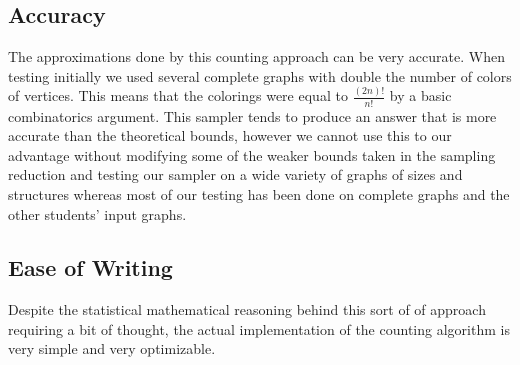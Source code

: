 \documentclass[14]{article}
\begin{document}
\subsection{Accuracy}
The approximations done by this counting approach can be very accurate. When testing initially we used several complete graphs with double the number of colors of vertices. This means that the colorings were equal to $\frac{(2n)!}{n!}$ by a basic combinatorics argument. This sampler tends to produce an answer that is more accurate than the theoretical bounds, however we cannot use this to our advantage without modifying some of the weaker bounds taken in the sampling reduction and testing our sampler on a wide variety of graphs of sizes and structures whereas most of our testing has been done on complete graphs and the other students' input graphs.
\subsection{Ease of Writing}
Despite the statistical mathematical reasoning behind this sort of of approach requiring a bit of thought, the actual implementation of the counting algorithm is very simple and very optimizable.
\end{document}

